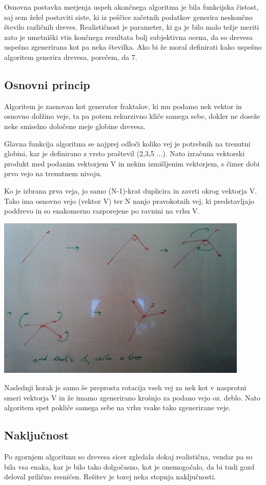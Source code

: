 \documentclass[10pt,a4paper,oneside]{book}
\begin{document}
Osnovna postavka merjenja uspeh akončnega algoritma je bila funkcijska
čistost, saj sem želel postaviti siste, ki iz peščice začetnih
podatkov generira neskončno število različnih dreves. Realističnost je
parameter, ki ga je bilo malo težje meriti zato je umetniški vtis
končnega rezultata bolj subjektivna ocena, da so drevesa uspešno
zgenerirana kot pa neka številka. Ako bi že moral definirati kako
uspešno algoritem generira drevesa, porečem, da 7.

\subsection{Osnovni princip}
Algoritem je zasnovan kot generator fraktalov, ki mu podamo nek vektor
in osnovno dolžino veje, ta pa potem rekurzivno kliče samega sebe,
dokler ne doseže neke smiselno določene meje globine drevesa.

Glavna funkcija algoritma se najprej odloči koliko vej je potrebnih na
trenutni globini, kar je definirano z vrsto praštevil (2,3,5
...). Nato izračuna vektorski produkt med podanim vektorjem V in nekim
izmišljenim vektorjem, s čimer dobi prvo vejo na trenutnem nivoju.

Ko je izbrana prva veja, jo samo (N-1)-krat duplicira in zavrti okrog
vektorja V. Tako ima osnovno vejo (vektor V) ter N nanjo pravokotnih
vej, ki predstavljajo poddrevo in so enakomerno razporejene po ravnini
na vrhu V.

\includegraphics[width=12cm]{algorithmsketch.jpg}

Naslednji korak je samo še preprosta rotacija vseh vej za nek kot v
nasprotni smeri vektorja V in že imamo zgenerirano krošnjo za podano
vejo oz. deblo. Nato algoritem spet pokliče samega sebe na vrhu vsake
tako zgenerirane veje.


\subsection{Naključnost}
Po zgornjem algoritmu so drevesa sicer zgledala dokaj realistična,
vendar pa so bila vsa enaka, kar je bilo tako dolgočasno, kot je
onemogočalo, da bi tudi gozd deloval prilično resničen. Rešitev je
torej neka stopnja naključnosti.
\end{document}
